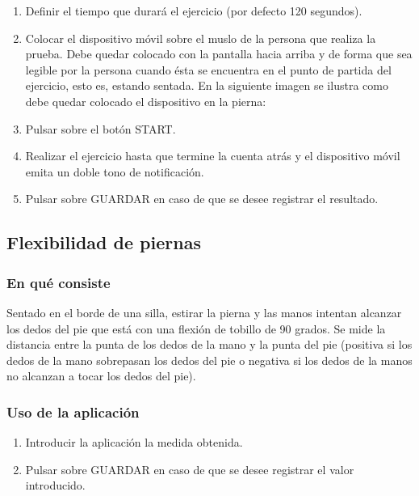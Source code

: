 \begin{enumerate}
\item Definir el tiempo que durará el ejercicio (por defecto 120 segundos). 
\item Colocar el dispositivo móvil sobre el muslo de la persona que realiza la prueba. Debe quedar colocado con la pantalla hacia arriba y de forma que sea legible por la persona cuando ésta se encuentra en el punto de partida del ejercicio, esto es, estando sentada. En la siguiente imagen se ilustra como debe quedar colocado el dispositivo en la pierna:

\item Pulsar sobre el botón START.
\item Realizar el ejercicio hasta que termine la cuenta atrás y el dispositivo móvil emita un doble tono de notificación.
\item Pulsar sobre GUARDAR en caso de que se desee registrar el resultado.
\end{enumerate}

\subsection{Flexibilidad de piernas}

\subsubsection{En qué consiste}

Sentado en el borde de una silla, estirar la pierna y las manos intentan alcanzar los dedos del pie que está con una flexión de tobillo de 90 grados. Se mide la distancia entre la punta de los dedos de la mano y la punta del pie (positiva si los dedos de la mano sobrepasan los dedos del pie o negativa si los dedos de la manos no alcanzan a tocar los dedos del pie).

\subsubsection{Uso de la aplicación}

\begin{enumerate}
\item Introducir la aplicación la medida obtenida.
\item Pulsar sobre GUARDAR en caso de que se desee registrar el valor introducido.
\end{enumerate}

